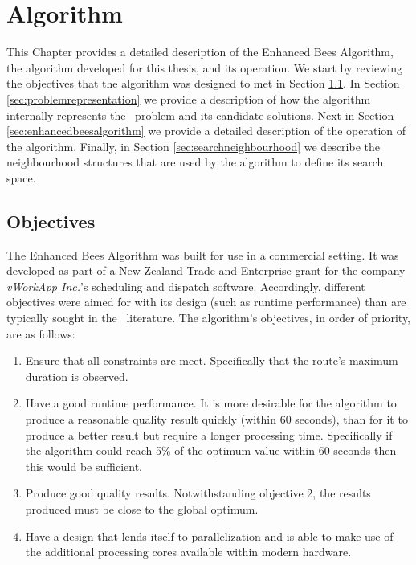 
\chapter{Algorithm}
\label{chap:algorithm}

This Chapter provides a detailed description of the Enhanced Bees Algorithm, the algorithm developed for this thesis, and its operation. We start by reviewing the objectives that the algorithm was designed to met in Section \ref{sec:objectives}. In Section \ref{sec:problemrepresentation} we provide a description of how the algorithm internally represents the \VRP\ problem and its candidate solutions. Next in Section \ref{sec:enhancedbeesalgorithm} we provide a detailed description of the operation of the algorithm. Finally, in Section \ref{sec:searchneighbourhood} we describe the neighbourhood structures that are used by the algorithm to define its search space.

\section{Objectives}
\label{sec:objectives}

The Enhanced Bees Algorithm was built for use in a commercial setting. It was developed as part of a New Zealand Trade and Enterprise grant for the company \emph{vWorkApp Inc.}'s scheduling and dispatch software. Accordingly, different objectives were aimed for with its design (such as runtime performance) than are typically sought in the \VRP\ literature. The algorithm's objectives, in order of priority, are as follows:

\begin{enumerate}
   \item Ensure that all constraints are meet. Specifically that the route's maximum duration is observed. 
   
   \item Have a good runtime performance. It is more desirable for the algorithm to produce a reasonable quality result quickly (within 60 seconds), than for it to produce a better result but require a longer processing time. Specifically if the algorithm could reach 5\% of the optimum value within 60 seconds then this would be sufficient. 

   \item Produce good quality results. Notwithstanding objective 2, the results produced must be close to the global optimum. 
   
   \item Have a design that lends itself to parallelization and is able to make use of the additional processing cores available within modern hardware.
   
\end{enumerate}

